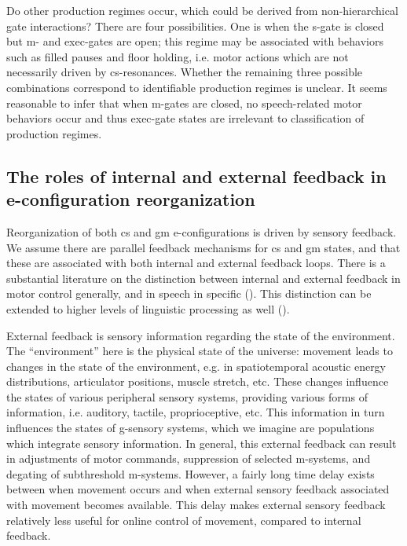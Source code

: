   Do other production regimes occur, which could  be derived from non-hierarchical gate interactions? There are four possibilities. One is when the s-gate is closed but m- and exec-gates are open; this regime may be associated with behaviors such as filled pauses and floor holding, i.e. motor actions which are not necessarily driven by cs-resonances. Whether the remaining three possible combinations correspond to identifiable production regimes is unclear. It seems reasonable to infer that when m-gates are closed, no speech-related motor behaviors occur and thus exec-gate states are irrelevant to classification of production regimes.

\subsection{The roles of internal and external feedback in e-configuration reorganization}

Reorganization of both cs and gm e-configurations is driven by sensory feedback. We assume there are parallel feedback mechanisms for cs and gm states, and that these are associated with both internal and external feedback loops. There is a substantial literature on the distinction between internal and external feedback in motor control generally, and in speech in specific (\citealt{Hickok2012,Kawato1999,MiallWolpert1996,RamanarayananEtAl2016,WolpertEtAl1995,WolpertKawato1998}). This distinction can be extended to higher levels of linguistic processing as well (\citealt{HagoortLevelt2009,Laver1973,Levelt1983,Levelt1989,Nooteboom1973,NooteboomQuené2008,Postma2000}).

  External feedback is sensory information regarding the state of the environment. The “environment” here is the physical state of the universe: movement leads to changes in the state of the environment, e.g. in spatiotemporal acoustic energy distributions, articulator positions, muscle stretch, etc. These changes influence the states of various peripheral sensory systems, providing various forms of information, i.e. auditory, tactile, proprioceptive, etc. This information in turn influences the states of g-sensory systems, which we imagine are populations which integrate sensory information. In general, this external feedback can result in adjustments of motor commands, suppression of selected m-systems, and degating of subthreshold m-systems. However, a fairly long time delay exists between when movement occurs and when external sensory feedback associated with movement becomes available. This delay makes external sensory feedback relatively less useful for online control of movement, compared to internal feedback. 


